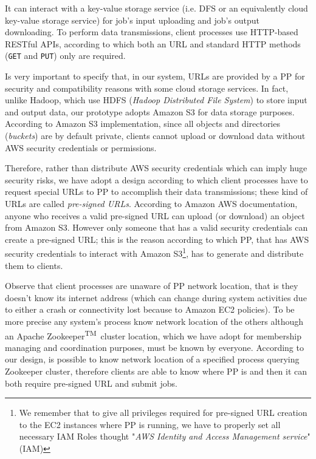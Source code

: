 \documentclass[sigchi]{acmart}
\begin{document}
It can interact with a key-value storage service (i.e. DFS or an equivalently cloud key-value storage service) for job's input uploading and job's output downloading. To perform data transmissions, client processes use HTTP-based RESTful APIs, according to which both an URL and standard HTTP methods (\texttt{GET} and \texttt{PUT}) only are required.

Is very important to specify that, in our system, URLs are provided by a PP for security and compatibility reasons with some cloud storage services. In fact, unlike Hadoop, which use HDFS (\textit{Hadoop Distributed File System}) to store input and output data, our prototype adopts Amazon S3 for data storage purposes. According to Amazon S3 implementation, since all objects and directories (\textit{buckets}) are by default private, clients cannot upload or download data without AWS security credentials or permissions.

Therefore, rather than distribute AWS security credentials which can imply huge security risks, we have adopt a design according to which client processes have to request special URLs to PP to accomplish their data transmissions; these kind of URLs are called \textit{pre-signed URLs}. According to Amazon AWS documentation, anyone who receives a valid pre-signed URL can upload (or download) an object from Amazon S3. However only someone that has a valid security credentials can create a pre-signed URL; this is the reason according to which PP, that has AWS security credentials to interact with Amazon S3\footnote{We remember that to give all privileges required for pre-signed URL creation to the EC2 instances where PP is running, we have to properly set all necessary IAM Roles thought "\textit{AWS Identity and Access Management service}" (IAM)}, has to generate and distribute them to clients.

Observe that client processes are unaware of PP network location, that is they doesn't know its internet address (which can change during system activities due to either a crash or connectivity lost because to Amazon EC2 policies). To be more precise any system's process know network location of the others although an Apache Zookeeper\textsuperscript{TM}\ cluster location, which we have adopt for membership managing and coordination purposes, must be known by everyone. According to our design, is possible to know network location of a specified process querying Zookeeper cluster, therefore clients are able to know where PP is and then it can both require pre-signed URL and submit jobs.
\end{document}
